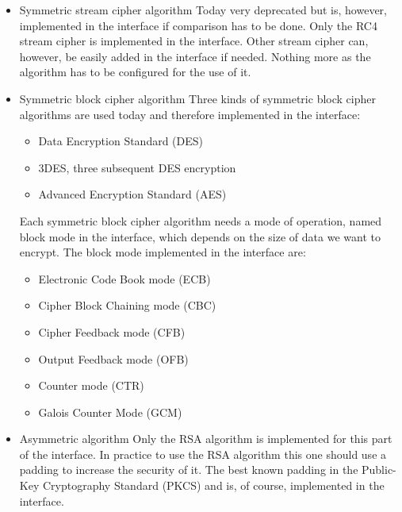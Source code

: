 \begin{itemize}
  \item Symmetric stream cipher algorithm\newline
  Today very deprecated but is, however,
implemented in the interface if comparison has to be done.\newline
Only the RC4 stream cipher is implemented in the interface.\newline
Other stream cipher can, however, be easily added in the interface if
needed.\newline
Nothing more as the algorithm has to be configured for the use of
it.\newline
  \item Symmetric block cipher algorithm\newline
  Three kinds of symmetric block cipher algorithms are used today and
therefore implemented in the interface:
\begin{itemize}
  \item Data Encryption Standard (DES)
  \item 3DES, three subsequent DES encryption
  \item Advanced Encryption Standard (AES)  
\end{itemize}
Each symmetric block cipher algorithm needs a mode of operation, named block
mode in the interface, which depends on the size of data we want to
encrypt.\newline
The block mode implemented in the interface are:
\begin{itemize}
  \item Electronic Code Book mode (ECB)
  \item Cipher Block Chaining mode (CBC)
  \item Cipher Feedback mode (CFB)
  \item Output Feedback mode (OFB)
  \item Counter mode (CTR)
  \item Galois Counter Mode (GCM)
\end{itemize}
  \item Asymmetric algorithm\newline
  Only the RSA algorithm is implemented for this part of the interface.\newline
  In practice to use the RSA algorithm this one should use a padding to increase
  the security of it.\newline
  The best known padding in the Public-Key Cryptography Standard (PKCS) and is,
of course, implemented in the interface.\newline  
\end{itemize} 

